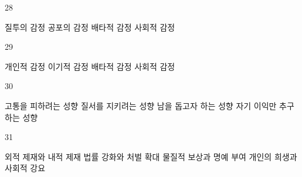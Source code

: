 \documentclass[fs9,seriesRus]{korfarm-base}
\begin{document}
\begin{kfSentenceUnit}{28}{}
\begin{kfChoices}
\kfChoice 질투의 감정
\kfChoice 공포의 감정
\kfChoice 배타적 감정
\kfChoice 사회적 감정
\end{kfChoices}
\end{kfSentenceUnit}

\begin{kfSentenceUnit}{29}{}
\begin{kfChoices}
\kfChoice 개인적 감정
\kfChoice 이기적 감정
\kfChoice 배타적 감정
\kfChoice 사회적 감정
\end{kfChoices}
\end{kfSentenceUnit}

\begin{kfSentenceUnit}{30}{}
\begin{kfChoices}
\kfChoice 고통을 피하려는 성향
\kfChoice 질서를 지키려는 성향
\kfChoice 남을 돕고자 하는 성향
\kfChoice 자기 이익만 추구하는 성향
\end{kfChoices}
\end{kfSentenceUnit}

\begin{kfSentenceUnit}{31}{}
\begin{kfChoices}
\kfChoice 외적 제재와 내적 제재
\kfChoice 법률 강화와 처벌 확대
\kfChoice 물질적 보상과 명예 부여
\kfChoice 개인의 희생과 사회적 강요
\end{kfChoices}
\end{kfSentenceUnit}

\kfEndMC

\kfActivityBg \par{}\par\nopagebreak[4]\smallskip\nopagebreak[4]
\begin{kfStructure}
\end{kfStructure}

\end{document}
